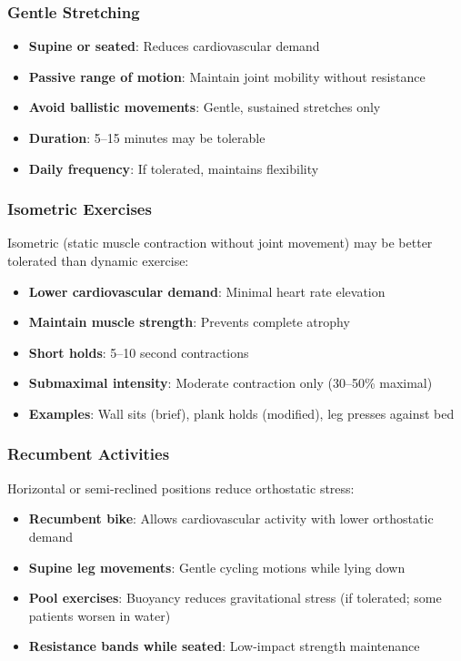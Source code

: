 \subsubsection{Gentle Stretching}

\begin{itemize}
    \item \textbf{Supine or seated}: Reduces cardiovascular demand
    \item \textbf{Passive range of motion}: Maintain joint mobility without resistance
    \item \textbf{Avoid ballistic movements}: Gentle, sustained stretches only
    \item \textbf{Duration}: 5--15 minutes may be tolerable
    \item \textbf{Daily frequency}: If tolerated, maintains flexibility
\end{itemize}

\subsubsection{Isometric Exercises}

Isometric (static muscle contraction without joint movement) may be better tolerated than dynamic exercise:

\begin{itemize}
    \item \textbf{Lower cardiovascular demand}: Minimal heart rate elevation
    \item \textbf{Maintain muscle strength}: Prevents complete atrophy
    \item \textbf{Short holds}: 5--10 second contractions
    \item \textbf{Submaximal intensity}: Moderate contraction only (30--50\% maximal)
    \item \textbf{Examples}: Wall sits (brief), plank holds (modified), leg presses against bed
\end{itemize}

\subsubsection{Recumbent Activities}

Horizontal or semi-reclined positions reduce orthostatic stress:

\begin{itemize}
    \item \textbf{Recumbent bike}: Allows cardiovascular activity with lower orthostatic demand
    \item \textbf{Supine leg movements}: Gentle cycling motions while lying down
    \item \textbf{Pool exercises}: Buoyancy reduces gravitational stress (if tolerated; some patients worsen in water)
    \item \textbf{Resistance bands while seated}: Low-impact strength maintenance
\end{itemize}

